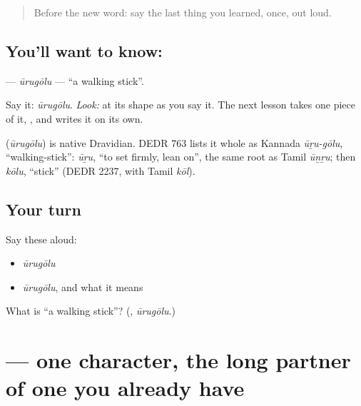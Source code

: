 \label{lesson:KA-C18-uurugoolu}



\begin{quote}
Before the new word: say the last thing you learned, once, out loud.
\end{quote}

\subsection*{You'll want to know: }
\textbf{} — \emph{ūrugōlu} — \textquotedblleft{}a walking stick\textquotedblright{}.

Say it: \emph{ūrugōlu}. \emph{Look:} at its shape as you say it. The next lesson takes one piece of it, \textbf{}, and writes it on its own.

\begin{cousinweb}
\textbf{} (\emph{ūrugōlu}) is native Dravidian. DEDR 763 lists it whole as Kannada \emph{ūṟu-gōlu}, \textquotedblleft{}walking-stick\textquotedblright{}: \emph{ūṟu}, \textquotedblleft{}to set firmly, lean on\textquotedblright{}, the same root as Tamil \emph{ūṉṟu}; then \emph{kōlu}, \textquotedblleft{}stick\textquotedblright{} (DEDR 2237, with Tamil \emph{kōl}).
\end{cousinweb}

\subsection*{Your turn}
Say these aloud:

\begin{itemize}
\raggedright
  \item \emph{ūrugōlu}
  \item \emph{ūrugōlu}, and what it means
\end{itemize}

\begin{tcolorbox}[breakable,colback=teal!4,colframe=teal!35!black,title={Before you move on}]
What is \textquotedblleft{}a walking stick\textquotedblright{}? (\textbf{}, \emph{ūrugōlu}.)
\end{tcolorbox}
\section[\texorpdfstring{\kn{ಊ} (ū)}{ಊ (ū)}]{ — one character, the long partner of one you already have}

\label{lesson:KA-S127-letter-uu}



